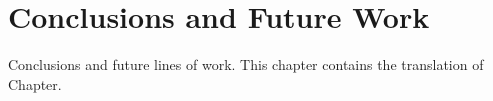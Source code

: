 \chapter{Conclusions and Future Work}
\label{cap:conclusions}

Conclusions and future lines of work. This chapter contains the translation of Chapter.


